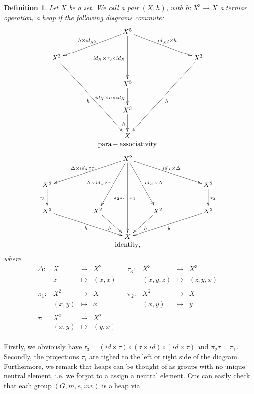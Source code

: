 \documentclass[10pt,a4paper]{article}
\newtheorem{defi}{Definition}
\begin{document}
\begin{defi}
Let $X$ be a set. We call a pair $(X, h)$, with $h : X^3 \longrightarrow X$ a terniar operation, a heap if the following diagrams commute:
$$\begin{array}{c}
\xymatrix{
&&&X^5 \ar[rrrd]^{id_{X^2} \times h}\ar[llld]_{h \times id_{X^2}} \ar[dd]_{id_{X} \times \tau_3 \times id_X}&&& \\
X^3\ar[rrrddd]_{h}&&&&&&X^3\ar[lllddd]^{h}\\
&&&X^5 \ar[d]_{id_X \times h \times id_X}&&&\\
&&&X^3\ar[d]_h&&&\\
&&&X&&&\\
}\\
\mathrm{para-associativity}\\
\end{array}$$$$
\begin{array}{c}
\xymatrix{
&&&X^2\ar[llld]_{\Delta \times id_X \circ \tau} \ar[ldd]_{\Delta \times id_X \circ \tau} \ar[ddd]^{\pi_1}_{\pi_2 \circ \tau}\ar[rdd]^{id_X \times \Delta}\ar[rrrd]^{id_X \times \Delta} &&&\\
X^3\ar[d]_{\tau_3}&&&&&& X^3\ar[d]^{\tau_3}\\
X^3\ar[rrrd]_h&&X^3\ar[rd]_h&&X^3\ar[ld]^{h}& &X^3\ar[llld]^{h}\\
&&&X&&&\\
}\\
\mathrm{identity,}\\
\end{array}
$$
where
$$\begin{array}{rrclcrrcl}
\Delta : &X& \longrightarrow &X^2,&&\tau_3 : &X^3& \longrightarrow& X^3\\
&x&\longmapsto&(x,x)&&&(x,y,z)&\longmapsto&(z,y,x)\\
&&&\\
\pi_1:&X^2&\longrightarrow&X&&\pi_2:&X^2&\longrightarrow&X\\
&(x,y)&\longmapsto&x&&
&(x,y)&\longmapsto&y\\
&&&\\
\tau :& X^2 &\longrightarrow&X^2\\
&(x,y)&\longmapsto&(y,x)\\
\end{array}$$
\end{defi}
Firstly, we obviously have $\tau_3 = (id \times \tau)\circ(\tau \times id) \circ (id \times \tau)$ and $\pi_2 \tau = \pi_1$. Secondly, the projections $\pi_i$ are tighed to the left or right side of the diagram. Furthermore, we remark that heaps can be thought of as groups with no unique neutral element, i.e. we forgot to a assign a neutral element. One can easily check that each group $(G, m, e, inv)$ is a heap via
\end{document}

